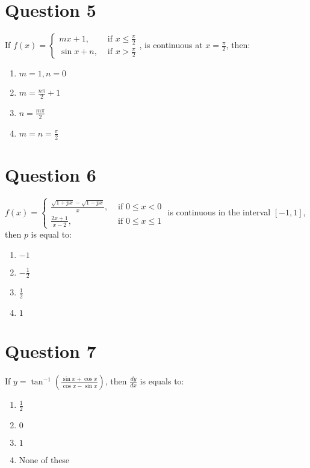 \documentclass{article}
\begin{document}
\section*{Question 5}
If \(f(x)=\left\{\begin{array}{ll}m x+1, & \text { if } x \leq \frac{\pi}{2} \\ \sin x+n, & \text { if } x>\frac{\pi}{2}\end{array}\right.\), is continuous at \(x=\frac{\pi}{2}\), then:
\begin{enumerate}[label=(\alph*)]
\item \({m}=1, {n}=0\)
\item \(m=\frac{n \pi}{2}+1\)
\item \({n}=\frac{{m} \pi}{2}\)
\item \({m}={n}=\frac{\pi}{2}\)
\end{enumerate}
\newpage
\section*{Question 6}
\(f(x)=\left\{\begin{array}{ll}\frac{\sqrt{1+p x}-\sqrt{1-p x}}{x}, & \text { if } 0 \leq x<0 \\ \frac{2 x+1}{x-2}, & \text { if } 0 \leq x \leq 1\end{array}\right.\) is continuous in the interval \([-1,1]\), then \(p\) is equal to:
\begin{enumerate}[label=(\alph*)]
\item \(-1\)
\item \(-\frac{1}{2}\)
\item \(\frac{1}{2}\)
\item \(1\)
\end{enumerate}
\newpage
\section*{Question 7}
If \(y=\tan ^{-1}\left(\frac{\sin x+\cos x}{\cos x-\sin x}\right)\), then \(\frac{d y}{d x}\) is equals to:
\begin{enumerate}[label=(\alph*)]
\item \(\frac{1}{2}\)
\item \(0\)
\item \(1\)
\item None of these
\end{enumerate}
\newpage
\end{document}
